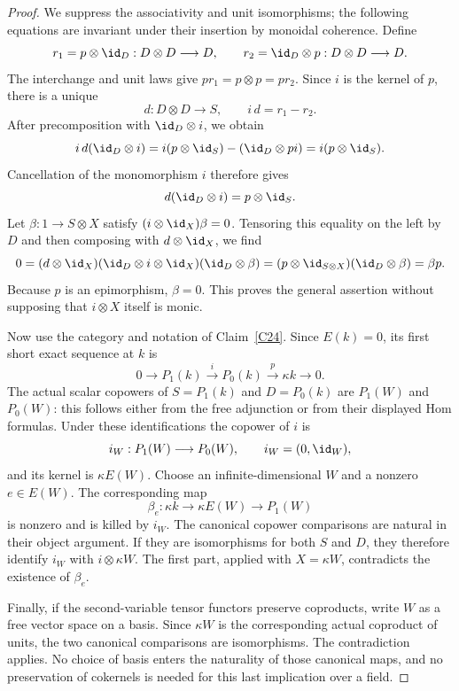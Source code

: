 \begin{proof}
We suppress the associativity and unit isomorphisms; the following equations are invariant under their insertion by monoidal coherence. Define
\[
r_1=p\otimes\id_D:D\otimes D\longrightarrow D,
\qquad
r_2=\id_D\otimes p:D\otimes D\longrightarrow D.
\]
The interchange and unit laws give $pr_1=p\otimes p=pr_2$. Since $i$ is the kernel of $p$, there is a unique
\[
d:D\otimes D\longrightarrow S,
\qquad i\,d=r_1-r_2.
\]
After precomposition with $\id_D\otimes i$, we obtain
\[
i\,d(\id_D\otimes i)
=i(p\otimes\id_S)-(\id_D\otimes pi)
=i(p\otimes\id_S).
\]
Cancellation of the monomorphism $i$ therefore gives
\[
d(\id_D\otimes i)=p\otimes\id_S.
\]
Let $\beta:1\to S\otimes X$ satisfy $(i\otimes\id_X)\beta=0$. Tensoring this equality on the left by $D$ and then composing with $d\otimes\id_X$, we find
\[
0=(d\otimes\id_X)(\id_D\otimes i\otimes\id_X)
  (\id_D\otimes\beta)
 =(p\otimes\id_{S\otimes X})(\id_D\otimes\beta)
 =\beta p.
\]
Because $p$ is an epimorphism, $\beta=0$. This proves the general assertion without supposing that $i\otimes X$ itself is monic.

Now use the category and notation of Claim~\ref{C24}. Since $E(k)=0$, its first short exact sequence at $k$ is
\[
0\longrightarrow P_1(k)\xrightarrow{i}P_0(k)
\xrightarrow{p}\kappa k\longrightarrow0.
\]
The actual scalar copowers of $S=P_1(k)$ and $D=P_0(k)$ are $P_1(W)$ and $P_0(W)$: this follows either from the free adjunction or from their displayed Hom formulas. Under these identifications the copower of $i$ is
\[
i_W:P_1(W)\longrightarrow P_0(W),\qquad i_W=(0,\id_W),
\]
and its kernel is $\kappa E(W)$. Choose an infinite-dimensional $W$ and a nonzero $e\in E(W)$. The corresponding map
\[
\beta_e:\kappa k\longrightarrow\kappa E(W)
\longrightarrow P_1(W)
\]
is nonzero and is killed by $i_W$. The canonical copower comparisons are natural in their object argument. If they are isomorphisms for both $S$ and $D$, they therefore identify $i_W$ with $i\otimes\kappa W$. The first part, applied with $X=\kappa W$, contradicts the existence of $\beta_e$.

Finally, if the second-variable tensor functors preserve coproducts, write $W$ as a free vector space on a basis. Since $\kappa W$ is the corresponding actual coproduct of units, the two canonical comparisons are isomorphisms. The contradiction applies. No choice of basis enters the naturality of those canonical maps, and no preservation of cokernels is needed for this last implication over a field.
\end{proof}
